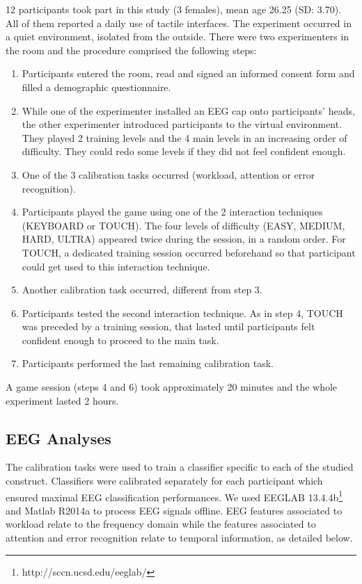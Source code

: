 \documentclass[]{sigchi}
\begin{document}
12 participants took part in this study (3 females), mean age 26.25 (SD:
3.70). All of them reported a daily use of tactile interfaces. The
experiment occurred in a quiet environment, isolated from the outside.
There were two experimenters in the room and the procedure comprised the
following steps:

\begin{enumerate}
\def\labelenumi{\arabic{enumi}.}
\itemsep1pt\parskip0pt
\item
  Participants entered the room, read and signed an informed consent
  form and filled a demographic questionnaire.
\item
  While one of the experimenter installed an EEG cap onto participants'
  heads, the other experimenter introduced participants to the virtual
  environment. They played 2 training levels and the 4 main levels in an
  increasing order of difficulty. They could redo some levels if they
  did not feel confident enough.
\item
  One of the 3 calibration tasks occurred (workload, attention or error
  recognition).
\item
  Participants played the game using one of the 2 interaction techniques
  (KEYBOARD or TOUCH). The four levels of difficulty (EASY, MEDIUM,
  HARD, ULTRA) appeared twice during the session, in a random order. For
  TOUCH, a dedicated training session occurred beforehand so that
  participant could get used to this interaction technique.
\item
  Another calibration task occurred, different from step 3.
\item
  Participants tested the second interaction technique. As in step 4,
  TOUCH was preceded by a training session, that lasted until
  participants felt confident enough to proceed to the main task.
\item
  Participants performed the last remaining calibration task.
\end{enumerate}

A game session (steps 4 and 6) took approximately 20 minutes and the
whole experiment lasted 2 hours.

\subsection{EEG Analyses}\label{eeg-analyses}

The calibration tasks were used to train a classifier specific to each
of the studied construct. Classifiers were calibrated separately for
each participant which ensured maximal EEG classification performances.
We used EEGLAB 13.4.4b\footnote{http://sccn.ucsd.edu/eeglab/} and Matlab
R2014a to process EEG signals offline. EEG features associated to
workload relate to the frequency domain while the features associated to
attention and error recognition relate to temporal information, as
detailed below.
\end{document}
